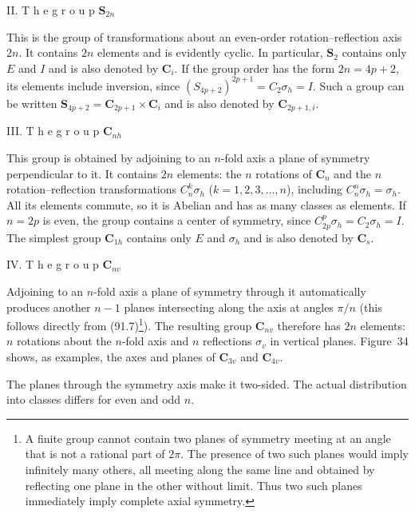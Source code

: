 \medskip
\noindent II. T h e  g r o u p $\boldsymbol{S}_{2n}$

This is the group of transformations about an even-order rotation--reflection axis $2n$. It contains $2n$ elements and is evidently cyclic. In particular, $\boldsymbol{S}_2$ contains only $E$ and $I$ and is also denoted by $\boldsymbol{C}_i$. If the group order has the form $2n=4p+2$, its elements include inversion, since $(S_{4p+2})^{2p+1}=C_2\sigma_h=I$. Such a group can be written $\boldsymbol{S}_{4p+2}=\boldsymbol{C}_{2p+1}\times\boldsymbol{C}_i$ and is also denoted by $\boldsymbol{C}_{2p+1,i}$.

\medskip
\noindent III. T h e  g r o u p $\boldsymbol{C}_{nh}$

This group is obtained by adjoining to an $n$-fold axis a plane of symmetry perpendicular to it. It contains $2n$ elements: the $n$ rotations of $\boldsymbol{C}_n$ and the $n$ rotation--reflection transformations $C_n^k\sigma_h$ ($k=1,2,3,\ldots,n$), including $C_n^n\sigma_h=\sigma_h$. All its elements commute, so it is Abelian and has as many classes as elements. If $n=2p$ is even, the group contains a center of symmetry, since $C_{2p}^p\sigma_h=C_2\sigma_h=I$. The simplest group $\boldsymbol{C}_{1h}$ contains only $E$ and $\sigma_h$ and is also denoted by $\boldsymbol{C}_s$.

\medskip
\noindent IV. T h e  g r o u p $\boldsymbol{C}_{nv}$

Adjoining to an $n$-fold axis a plane of symmetry through it automatically produces another $n-1$ planes intersecting along the axis at angles $\pi/n$ (this follows directly from (91.7)\footnote{A finite group cannot contain two planes of symmetry meeting at an angle that is not a rational part of $2\pi$. The presence of two such planes would imply infinitely many others, all meeting along the same line and obtained by reflecting one plane in the other without limit. Thus two such planes immediately imply complete axial symmetry.}). The resulting group $\boldsymbol{C}_{nv}$ therefore has $2n$ elements: $n$ rotations about the $n$-fold axis and $n$ reflections $\sigma_v$ in vertical planes. Figure~34 shows, as examples, the axes and planes of $\boldsymbol{C}_{3v}$ and $\boldsymbol{C}_{4v}$.

The planes through the symmetry axis make it two-sided. The actual distribution into classes differs for even and odd $n$.

\begin{figure}[ht]
\centering
{}
\caption{}
\label{fig:93-34}
\end{figure}


